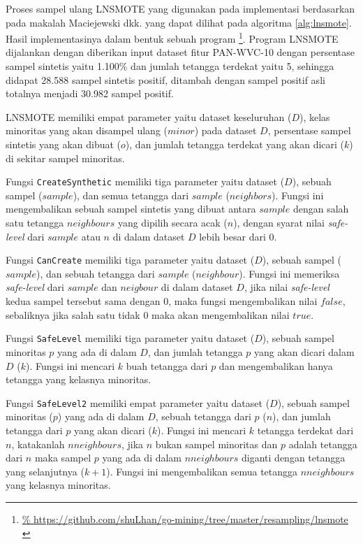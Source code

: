 Proses sampel ulang LNSMOTE yang digunakan pada implementasi berdasarkan
pada makalah Maciejewski dkk.
\cite{maciejewski2011local}
yang dapat dilihat pada algoritma
\ref{alg:lnsmote}.
Hasil implementasinya dalam bentuk sebuah program
\footnote{\url{%
https://github.com/shuLhan/go-mining/tree/master/resampling/lnsmote
}}.
Program LNSMOTE dijalankan dengan diberikan input dataset fitur PAN-WVC-10
dengan persentase sampel sintetis yaitu 1.100\% dan jumlah tetangga terdekat
yaitu 5, sehingga didapat 28.588 sampel sintetis positif, ditambah dengan
sampel positif asli totalnya menjadi 30.982 sampel positif.

	\newpage
	

LNSMOTE memiliki empat parameter yaitu dataset keseluruhan ($D$), kelas
minoritas yang akan disampel ulang ($minor$) pada dataset $D$, persentase
sampel sintetis yang akan dibuat ($o$), dan jumlah tetangga terdekat yang akan
dicari ($k$) di sekitar sampel minoritas.

Fungsi \texttt{CreateSynthetic} memiliki tiga parameter yaitu dataset ($D$),
sebuah sampel ($sample$), dan semua tetangga dari $sample$ ($neighbors$).
Fungsi ini mengembalikan sebuah sampel sintetis yang dibuat antara $sample$
dengan salah satu tetangga $neighbours$ yang dipilih secara acak ($n$), dengan
syarat nilai \textit{safe-level} dari $sample$ atau $n$ di dalam dataset $D$
lebih besar dari $0$.

Fungsi \texttt{CanCreate} memiliki tiga parameter yaitu dataset ($D$), sebuah
sampel ($sample$), dan sebuah tetangga dari $sample$ ($neighbour$).
Fungsi ini memeriksa \textit{safe-level} dari $sample$ dan $neigbour$ di dalam
dataset $D$, jika nilai \textit{safe-level} kedua sampel tersebut sama dengan
0, maka fungsi mengembalikan nilai $false$, sebaliknya jika salah satu tidak 0
maka akan mengembalikan nilai $true$.

Fungsi \texttt{SafeLevel} memiliki tiga parameter yaitu dataset ($D$), sebuah
sampel minoritas $p$ yang ada di dalam $D$, dan jumlah tetangga $p$ yang akan dicari
dalam $D$ ($k$).
Fungsi ini mencari $k$ buah tetangga dari $p$ dan mengembalikan hanya tetangga
yang kelasnya minoritas.

Fungsi \texttt{SafeLevel2} memiliki empat parameter yaitu dataset ($D$), sebuah
sampel minoritas ($p$) yang ada di dalam $D$, sebuah tetangga dari $p$ ($n$),
dan jumlah tetangga dari $p$ yang akan dicari ($k$).
Fungsi ini mencari $k$ tetangga terdekat dari $n$, katakanlah $nneighbours$,
jika $n$ bukan sampel minoritas dan $p$ adalah tetangga dari $n$ maka sampel
$p$ yang ada di dalam $nneighbours$ diganti dengan tetangga yang selanjutnya
($k+1$).
Fungsi ini mengembalikan semua tetangga $nneighbours$ yang kelasnya minoritas.

